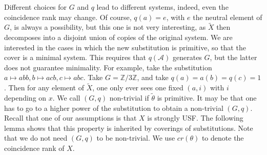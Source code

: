 \documentclass[12pt]{amsart}
\theoremstyle{definition}
\numberwithin{equation}{section}
\newcommand{\Aa}{{\mathcal A}}
\begin{document}
Different choices for $G$ and $q$ lead to different systems, indeed, even the coincidence rank may change. Of course, $q(a) = e$, with $e$ the neutral element of $G$, is always a possibility, but this one is not very interesting, as $\tilde X$ then decomposes into a disjoint union of copies of the original system. 
We are interested in the cases in which the new substitution is primitive, so that the cover is a minimal system. This requires that $q(\Aa)$ generates $G$, but the latter does not guarantee minimality. For example, take the substitution $a\mapsto abb, b \mapsto acb , 
c \mapsto abc$. Take $G= \mathbb Z/3 \mathbb Z$, and take $q(a)=a(b)=q(c)=1$. Then for any element of $\tilde X$, one only ever sees one fixed $(a,i)$ with $i$ depending on $x$.
We call $(G,q)$ non-trivial if $\tilde\theta$ is primitive. 
It may be that one has to go to a higher power of the substitution to obtain a non-trivial $(G,q)$. 
Recall that one of our assumptions is that $X$ is strongly USF. 
The following lemma shows that this property is inherited by  coverings of substitutions. Note that we do not need  $(G,q)$ to be non-trivial. We use $cr(\theta)$ to denote the coincidence rank of $X$.
\end{document}

